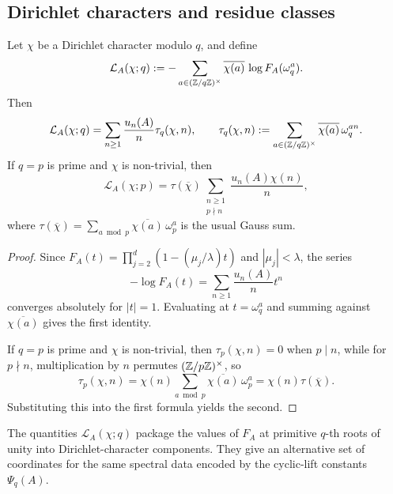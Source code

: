 \subsection{Dirichlet characters and residue classes}

\begin{proposition}
  \label{prop:finite-part-dirichlet-torsion-gauss-expansion}
  Let \(\chi\) be a Dirichlet character modulo \(q\), and define
  \[
    \mathcal L_A(\chi;q)
    :=-\sum_{a\in(\mathbb{Z}/q\mathbb{Z})^\times}
      \overline{\chi(a)}\,\log F_A(\omega_q^a).
  \]
  Then
  \[
    \mathcal L_A(\chi;q)
    =\sum_{n\ge 1}\frac{u_n(A)}{n}
      \tau_q(\chi,n),
    \qquad
    \tau_q(\chi,n)
    :=\sum_{a\in(\mathbb{Z}/q\mathbb{Z})^\times}
      \overline{\chi(a)}\,\omega_q^{an}.
  \]
  If \(q=p\) is prime and \(\chi\) is non-trivial, then
  \[
    \mathcal L_A(\chi;p)
    =\tau(\overline{\chi})
      \sum_{\substack{n\ge 1\\ p\nmid n}}
        \frac{u_n(A)\chi(n)}{n},
  \]
  where
  \(
    \tau(\overline{\chi})
    =\sum_{a\bmod p}\overline{\chi(a)}\,\omega_p^a
  \)
  is the usual Gauss sum.
\end{proposition}

\begin{proof}
  Since \(F_A(t)=\prod_{j=2}^d(1-(\mu_j/\lambda)t)\) and
  \(|\mu_j|<\lambda\), the series
  \[
    -\log F_A(t)=\sum_{n\ge 1}\frac{u_n(A)}{n}t^n
  \]
  converges absolutely for \(|t|=1\). Evaluating at \(t=\omega_q^a\) and
  summing against \(\overline{\chi(a)}\) gives the first identity.

  If \(q=p\) is prime and \(\chi\) is non-trivial, then
  \(\tau_p(\chi,n)=0\) when \(p\mid n\), while for \(p\nmid n\),
  multiplication by \(n\) permutes \((\mathbb{Z}/p\mathbb{Z})^\times\), so
  \[
    \tau_p(\chi,n)
    =\chi(n)\sum_{a\bmod p}\overline{\chi(a)}\,\omega_p^a
    =\chi(n)\tau(\overline{\chi}).
  \]
  Substituting this into the first formula yields the second.
\end{proof}

\begin{remark}
  The quantities \(\mathcal L_A(\chi;q)\) package the values of
  \(F_A\) at primitive \(q\)-th roots of unity into Dirichlet-character
  components. They give an alternative set of coordinates for the same
  spectral data encoded by the cyclic-lift constants \(\Psi_q(A)\).
\end{remark}

